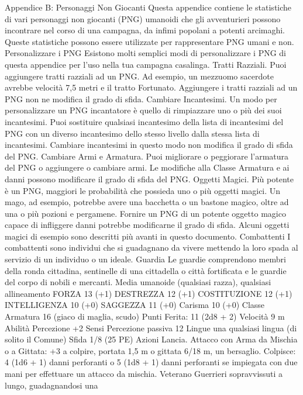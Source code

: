\begin{multicols}{2}
Appendice B:
Personaggi Non
Giocanti
Questa appendice contiene le statistiche di vari
personaggi non giocanti (PNG) umanoidi che gli
avventurieri possono incontrare nel corso di una
campagna, da infimi popolani a potenti arcimaghi.
Queste statistiche possono essere utilizzate per
rappresentare PNG umani e non.
Personalizzare i PNG
Esistono molti semplici modi di personalizzare i PNG di
questa appendice per l’uso nella tua campagna
casalinga.
Tratti Razziali. Puoi aggiungere tratti razziali ad un
PNG. Ad esempio, un mezzuomo sacerdote avrebbe
velocità 7,5 metri e il tratto Fortunato. Aggiungere i tratti
razziali ad un PNG non ne modifica il grado di sfida.
Cambiare Incantesimi. Un modo per personalizzare
un PNG incantatore è quello di rimpiazzare uno o più
dei suoi incantesimi. Puoi sostituire qualsiasi
incantesimo della lista di incantesimi del PNG con un
diverso incantesimo dello stesso livello dalla stessa
lista di incantesimi. Cambiare incantesimi in questo
modo non modifica il grado di sfida del PNG.
Cambiare Armi e Armatura. Puoi migliorare o
peggiorare l’armatura del PNG o aggiungere o
cambiare armi. Le modifiche alla Classe Armatura e ai
danni possono modificare il grado di sfida del PNG.
Oggetti Magici. Più potente è un PNG, maggiori le
probabilità che possieda uno o più oggetti magici. Un
mago, ad esempio, potrebbe avere una bacchetta o un
bastone magico, oltre ad una o più pozioni e
pergamene. Fornire un PNG di un potente oggetto
magico capace di infliggere danni potrebbe modificarne
il grado di sfida.
Alcuni oggetti magici di esempio sono descritti più
avanti in questo documento.
Combattenti
I combattenti sono individui che si guadagnano da
vivere mettendo la loro spada al servizio di un individuo
o un ideale.
Guardia
Le guardie comprendono membri della ronda cittadina,
sentinelle di una cittadella o città fortificata e le guardie
del corpo di nobili e mercanti.
Media umanoide (qualsiasi razza), qualsiasi allineamento
FORZA 13 (+1)
DESTREZZA 12 (+1)
COSTITUZIONE 12 (+1)
INTELLIGENZA 10 (+0)
SAGGEZZA 11 (+0)
Carisma 10 (+0)
Classe Armatura 16 (giaco di maglia, scudo)
\hspace*{0pt}\hfill{Punti Ferita}: 11 (2d8 + 2)
Velocità 9 m
Abilità Percezione +2
Sensi Percezione passiva 12
Lingue una qualsiasi lingua (di solito il Comune)
Sfida 1/8 (25 PE)
Azioni
Lancia. Attacco con Arma da Mischia o a Gittata: +3 a colpire,
portata 1,5 m o gittata 6/18 m, un bersaglio.
Colpisce: 4 (1d6 + 1) danni perforanti o 5 (1d8 + 1) danni
perforanti se impiegata con due mani per effettuare un attacco da
mischia.
Veterano
Guerrieri sopravvissuti a lungo, guadagnandosi una

\end{multicols}
